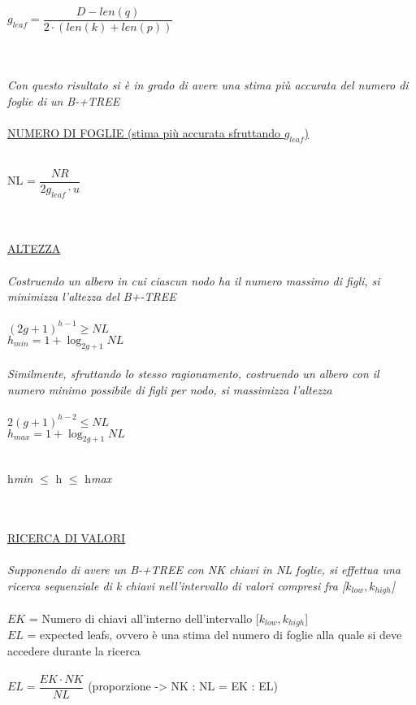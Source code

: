 \documentclass[a4paper,12pt]{article}
\begin{document}
\begin{titlepage}
	\centerline{{\Large ${ g_{leaf} = \dfrac{D - len(q)}{2 \cdot (len(k) + len(p))}}$}} \\ \\
	\textit{Con questo risultato si è in grado di avere una stima più accurata del numero di foglie di un B-+TREE} \\ \\
	\underline{NUMERO DI FOGLIE (stima più accurata sfruttando ${g_{leaf}}$)} \\ \\
	\centerline{{\Large NL = ${\dfrac{NR}{2g_{leaf} \cdot u}}$}} \\ \\
	\underline{ALTEZZA} \\ \\
	\textit{Costruendo un albero in cui ciascun nodo ha il numero massimo di figli, si minimizza l'altezza del B+-TREE} \\ \\
	${(2g + 1)^{h - 1} \ge NL}$ \\
	${h_{min} = 1 + \log_{2g+1}NL}$ \\ \\
	\textit{Similmente, sfruttando lo stesso ragionamento, costruendo un albero con il numero minimo possibile di figli per nodo, si massimizza l'altezza} \\ \\
	${2(g + 1)^{h - 2} \leq NL}$ \\ 
	${h_{max} = 1 + \log_{2g+1}NL}$ \\ \\
	\centerline{{\Large h\textit{min} ${\leq}$ h ${\leq}$ h\textit{max}}} \\ \\
	\underline{RICERCA DI VALORI} \\ \\
	\textit{Supponendo di avere un B-+TREE con NK chiavi in NL foglie, si effettua una ricerca sequenziale di k chiavi nell'intervallo di valori compresi fra [${k_{low}, k_{high}}$]} \\ \\
	${EK}$ = Numero di chiavi all'interno dell'intervallo [${k_{low}, k_{high}}$] \\
	${EL}$ = expected leafs, ovvero è una stima del numero di foglie alla quale si deve accedere durante la ricerca \\ \\
	${EL = \dfrac{EK \cdot NK}{NL}}$ (proporzione -> NK : NL = EK : EL) \\ \\

\end{titlepage}
\end{document}
